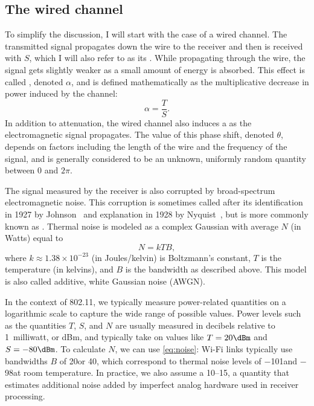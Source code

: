 \subsection{The wired channel}
To simplify the discussion, I will start with the case of a wired channel. The transmitted signal propagates down the wire to the receiver and then is received with  $S$, which I will also refer to as its . While propagating through the wire, the signal gets slightly weaker as a small amount of energy is absorbed. This effect is called , denoted $\alpha$, and is defined mathematically as the multiplicative decrease in power induced by the channel:
\begin{equation}
	\label{eq:attenuation}
	\alpha = \frac{T}{S}.
\end{equation}
In addition to attenuation, the wired channel also induces a  as the electromagnetic signal propagates. The value of this phase shift, denoted $\theta$, depends on factors including the length of the wire and the frequency of the signal, and is generally considered to be an unknown, uniformly random quantity between $0$ and $2\pi$.

The signal measured by the receiver is also corrupted by broad-spectrum electromagnetic noise. This corruption is sometimes called  after its identification in 1927 by Johnson~\cite{Johnson_noise} and explanation in 1928 by Nyquist~\cite{Nyquist_noise}, but is more commonly known as . Thermal noise is modeled as a complex Gaussian with average  $N$ (in Watts) equal to
\begin{equation}
\label{eq:noise}
N = kTB,
\end{equation}
where $k\approx1.38\times10^{-23}$ (in Joules/kelvin) is Boltzmann's constant, $T$ is the temperature (in kelvins), and $B$ is the bandwidth as described above. This model is also called additive, white Gaussian noise (AWGN).

In the context of 802.11, we typically measure power-related quantities on a logarithmic scale to capture the wide range of possible values. Power levels such as the quantities $T$, $S$, and $N$ are usually measured in decibels relative to 1~milliwatt, or dBm, and typically take on values like $T=20\dBm$ and $S=-80\dBm$. To calculate $N$, we can use \eqref{eq:noise}: Wi-Fi links typically use bandwidths $B$ of 20\MHz or 40\MHz, which correspond to thermal noise levels of $-$101\dBm and $-$98\dBm at room temperature. In practice, we also assume a 10\dB--15\dB {}, a quantity that estimates additional noise added by imperfect analog hardware used in receiver processing.

